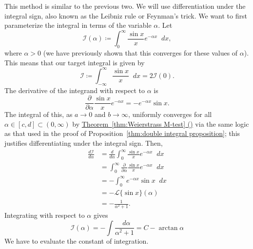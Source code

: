 \documentclass[a4paper]{article}
\newcommand*\diff{\mathop{}\!d} %
\theoremstyle{definition}
\begin{document}
This method is similar to the previous two.
We will use differentiation under the integral sign, also known as the Leibniz rule or Feynman's trick.
We want to first parameterize the integral in terms of the variable $\alpha$.
Let
\begin{equation*}
    \mathcal{I}(\alpha) \coloneq \int_{0}^{\infty} \frac{\sin x}{x} e^{- \alpha x} \diff x,
\end{equation*}
where $\alpha > 0$ (we have previously shown that this converges for these values of $\alpha$).
This means that our target integral is given by
\begin{equation*}
    \mathcal{I} \coloneq \int_{-\infty}^{\infty} \frac{\sin x}{x} \diff x = 2\mathcal{I}(0).
\end{equation*}
The derivative of the integrand with respect to $\alpha$ is
\begin{equation*}
    \frac{\partial}{\partial \alpha} \frac{\sin x}{x} e^{- \alpha x} = - e^{- \alpha x} \sin x.
\end{equation*}
The integral of this, as $a \to 0$ and $b \to \infty$,
uniformly converges for all $\alpha \in [c,d] \subset (0, \infty)$ by \hyperref[thm:Weierstrass M-test]{Theorem~\ref*{thm:Weierstrass M-test} ()} via the same logic as that used in the proof of Proposition~\ref{thm:double integral proposition}; this justifies differentiating under the integral sign.
Then,
\begin{align*}
    \frac{d\mathcal{I}}{d \alpha} & = \frac{d}{d \alpha} \int_{0}^{\infty} \frac{\sin x}{x} e^{- \alpha x} \diff x               \\
                                  & = \int_{0}^{\infty} \frac{\partial}{\partial \alpha} \frac{\sin x}{x} e^{- \alpha x} \diff x \\
                                  & = - \int_{0}^{\infty} e^{- \alpha x} \sin x  \diff x                                         \\
                                  & = - \mathscr{L} \{\sin x\}(\alpha)                                                           \\
                                  & = - \frac{1}{\alpha^2 + 1}.
\end{align*}
Integrating with respect to $\alpha$ gives
\begin{equation*}
    \mathcal{I}(\alpha) = - \int \frac{\diff \alpha}{\alpha^2 + 1} = C - \arctan \alpha
\end{equation*}
We have to evaluate the constant of integration.
\end{document}
